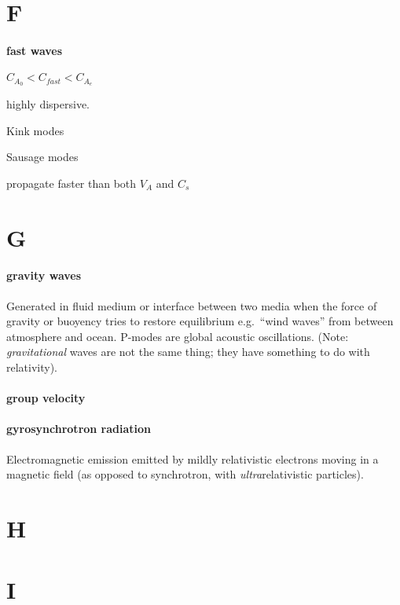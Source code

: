 \documentclass[12pt]{article}
\begin{document}
\section*{F}

\paragraph{fast waves}
\begin{itemize*}
    \item $C_{A_0} < C_{fast} < C_{A_e} $
    \item highly dispersive.
    \item Kink modes
    \item Sausage modes
    \item propagate faster than both $V_A$ and $C_s$
\end{itemize*}

\section*{G}

\paragraph{gravity waves}
Generated in fluid medium or interface between two media when the
force of gravity or buoyency tries to restore equilibrium
e.g.\ ``wind waves'' from between atmosphere and ocean.
P-modes are global acoustic oscillations.
(Note: \emph{gravitational} waves are not the same thing; they
have something to do with relativity).

\paragraph{group velocity}

\paragraph{gyrosynchrotron radiation}
Electromagnetic emission emitted by mildly relativistic electrons moving
in a magnetic field
(as opposed to synchrotron, with \emph{ultra}relativistic particles).

\section*{H}

\section*{I}
\end{document}
